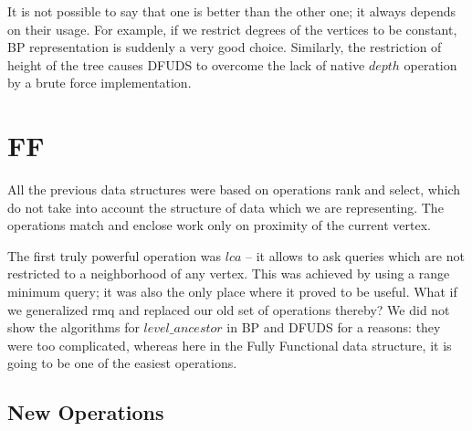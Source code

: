 It is not possible to say that one is better than the other one; it always depends on their usage.
For example, if we restrict degrees of the vertices to be constant, BP representation is suddenly a very good choice.
Similarly, the restriction of height of the tree causes DFUDS to overcome the lack of native $depth$ operation by a brute force implementation.

\section{FF}

All the previous data structures were based on operations rank and select, which do not take into account the structure of data which we are representing.
The operations match and enclose work only on proximity of the current vertex.

The first truly powerful operation was $lca$ -- it allows to ask queries which are not restricted to a neighborhood of any vertex.
This was achieved by using a range minimum query; it was also the only place where it proved to be useful.
What if we generalized rmq and replaced our old set of operations thereby?
We did not show the algorithms for $level\_ancestor$ in BP and DFUDS for a reasons: they were too complicated, whereas here in the Fully Functional data structure, it is going to be one of the easiest operations.


\subsection{New Operations}

